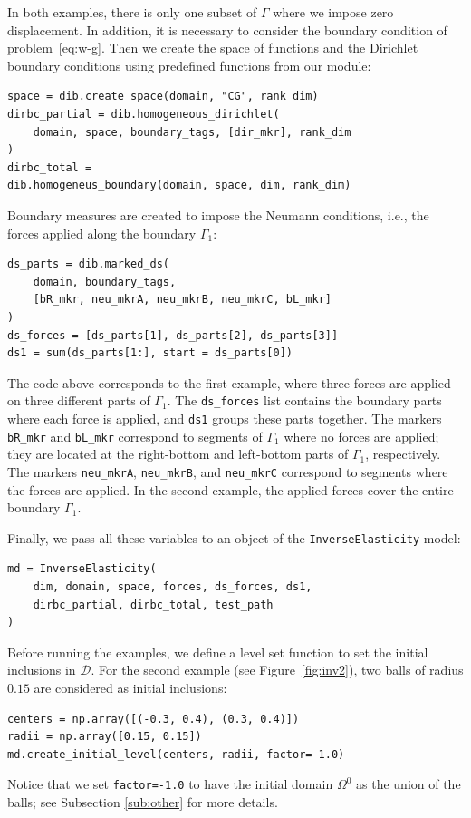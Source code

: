 \documentclass[preprint,9pt]{elsarticle}
\begin{document}
In both examples, there is only one subset of $\Gamma$ where
we impose zero displacement. In addition, it is necessary to consider the 
boundary condition of problem~\eqref{eq:w-g}.  
Then we create the space of functions and the Dirichlet boundary conditions
using predefined functions from our module:
\begin{lstlisting}
space = dib.create_space(domain, "CG", rank_dim)
dirbc_partial = dib.homogeneous_dirichlet(
	domain, space, boundary_tags, [dir_mkr], rank_dim
)
dirbc_total =
dib.homogeneus_boundary(domain, space, dim, rank_dim)
\end{lstlisting}

Boundary measures are created to impose the Neumann conditions, i.e.,
the forces applied along the boundary $\Gamma_1$:
\begin{lstlisting}
ds_parts = dib.marked_ds(
	domain, boundary_tags,
	[bR_mkr, neu_mkrA, neu_mkrB, neu_mkrC, bL_mkr]
)
ds_forces = [ds_parts[1], ds_parts[2], ds_parts[3]] 
ds1 = sum(ds_parts[1:], start = ds_parts[0])
\end{lstlisting}
The code above corresponds to the first example, where three forces are applied
on three different parts of $\Gamma_1$.
The \texttt{ds\_forces} list contains the boundary parts where each force is applied, 
and \texttt{ds1} groups these parts together.
The markers \texttt{bR\_mkr} and \texttt{bL\_mkr} correspond to segments of $\Gamma_1$ where
no forces are applied;
they are located at the right-bottom and left-bottom parts of $\Gamma_1$, respectively. 
The markers \texttt{neu\_mkrA}, \texttt{neu\_mkrB}, and \texttt{neu\_mkrC}
correspond to segments where the forces are applied.
In the second example, the applied forces cover the entire boundary $\Gamma_1$.

Finally, we pass all these variables to an object of the \texttt{InverseElasticity} model:
\begin{lstlisting}
md = InverseElasticity(
	dim, domain, space, forces, ds_forces, ds1,
	dirbc_partial, dirbc_total, test_path
)
\end{lstlisting}
Before running the examples, we define a level set function to set
the initial inclusions in $\mathcal{D}$.
For the second example (see Figure~\ref{fig:inv2}),
two balls of radius $0.15$ are considered as initial inclusions:
\begin{lstlisting}
centers = np.array([(-0.3, 0.4), (0.3, 0.4)])
radii = np.array([0.15, 0.15])
md.create_initial_level(centers, radii, factor=-1.0)
\end{lstlisting}
Notice that we set \texttt{factor=-1.0} to have the initial domain $\Omega^0$
as the union of the balls; see Subsection \ref{sub:other} for more details.
\end{document}
